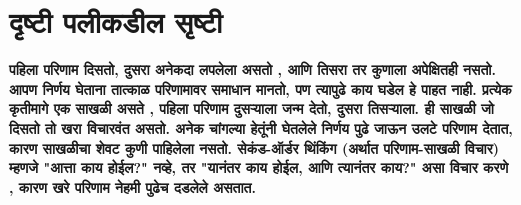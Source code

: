\chapter{दृष्टी पलीकडील सृष्टी}

\textcolor{blue!60!black}{\textbf{पहिला परिणाम दिसतो, दुसरा अनेकदा लपलेला असतो , आणि तिसरा तर कुणाला अपेक्षितही नसतो. आपण निर्णय घेताना तात्काळ परिणामावर समाधान मानतो, पण त्यापुढे काय घडेल हे पाहत नाही. प्रत्येक कृतीमागे एक साखळी असते , पहिला परिणाम दुसऱ्याला जन्म देतो, दुसरा तिसऱ्याला. ही साखळी जो दिसतो तो खरा विचारवंत असतो. अनेक चांगल्या हेतूंनी घेतलेले निर्णय पुढे जाऊन उलटे परिणाम देतात, कारण साखळीचा शेवट कुणी पाहिलेला नसतो. सेकंड-ऑर्डर थिंकिंग (अर्थात परिणाम-साखळी विचार) म्हणजे "आत्ता काय होईल?" नव्हे, तर "यानंतर काय होईल, आणि त्यानंतर काय?" असा विचार करणे , कारण खरे परिणाम नेहमी पुढेच दडलेले असतात.}}

